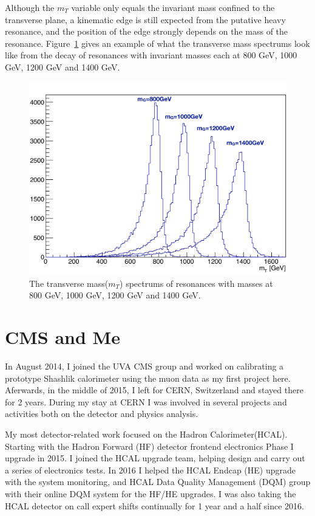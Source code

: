 \vspace{0.3cm}
Although the $m_{T}$ variable only equals the invariant mass confined to the transverse plane, a kinematic edge is still expected from the putative heavy resonance, and the position of the edge strongly depends on the mass of the resonance. Figure~\ref{fig:intro_mt} gives an example of what the transverse mass spectrums look like from the decay of resonances with invariant masses each at 800 GeV, 1000 GeV, 1200 GeV and 1400 GeV.

\begin{figure}[htbp]
\begin{center}
\includegraphics[width=0.72\linewidth]{figures/intro_example_mt.pdf}
\caption{The transverse mass($m_{T}$) spectrums of resonances with masses at 800 GeV, 1000 GeV, 1200 GeV and 1400 GeV.}
\label{fig:intro_mt}
\end{center}
\end{figure}


\section{CMS and Me} %
In August 2014, I joined the UVA CMS group and worked on calibrating a prototype Shashlik calorimeter using the muon data as my first project here. Aferwards, in the middle of 2015, I left for CERN, Switzerland and stayed there for 2 years. During my stay at CERN I was involved in several projects and activities both on the detector and physics analysis. 

\vspace{0.3cm}
My most detector-related work focused on the Hadron Calorimeter(HCAL). Starting with the Hadron Forward (HF) detector frontend electronics Phase I upgrade in 2015. I joined the HCAL upgrade team, helping design and carry out a series of electronics tests. In 2016 I helped the HCAL Endcap (HE) upgrade with the system monitoring, and HCAL Data Quality Management (DQM) group with their online DQM system for the HF/HE upgrades. I was also taking the HCAL detector on call expert shifts continually for 1 year and a half since 2016.

